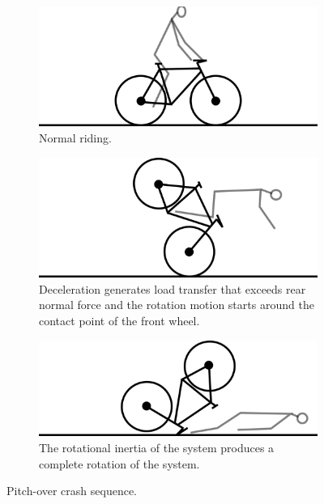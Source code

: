 \documentclass{article}
\begin{document}
\begin{figure}
    \centering
    \begin{subfigure}[t]{0.3\textwidth}
        \centering
        \includegraphics[width=\textwidth]{pitch-over-stage1.png}
        \caption{Normal riding.}
    \end{subfigure}%
    \begin{subfigure}[t]{0.3\textwidth}
        \centering
        \includegraphics[width=\textwidth]{pitch-over-stage2.png}
        \caption{Deceleration generates load transfer that exceeds rear normal force and the rotation motion starts around the contact point of the front wheel.}
    \end{subfigure}
    \begin{subfigure}[t]{0.3\textwidth}
        \centering
        \includegraphics[width=\textwidth]{pitch-over-stage3.png}
        \caption{The rotational inertia of the system produces a complete rotation of the system.}
    \end{subfigure}
    \caption{Pitch-over crash sequence.}
    \label{fig: pitchover}
\end{figure}
\end{document}

